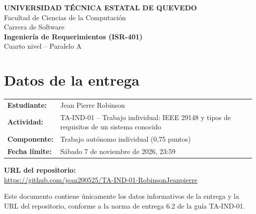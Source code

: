 \documentclass[12pt,a4paper]{article}
\begin{document}
\begin{center}
  {\large\bfseries UNIVERSIDAD TÉCNICA ESTATAL DE QUEVEDO}\\[4pt]
  Facultad de Ciencias de la Computación\\
  Carrera de Software\\[10pt]
  {\large\bfseries Ingeniería de Requerimientos (ISR-401)}\\[4pt]
  Cuarto nivel -- Paralelo A
\end{center}

\vspace{1.2cm}

\section*{Datos de la entrega}

\begin{tabular}{@{}p{4.5cm}p{10cm}@{}}
  \textbf{Estudiante:}      & Jean Pierre Robinson \\[6pt]
  \textbf{Actividad:}       & TA-IND-01 -- Trabajo individual: IEEE 29148 y
                              tipos de requisitos de un sistema conocido \\[6pt]
  \textbf{Componente:}      & Trabajo autónomo individual (0,75 puntos) \\[6pt]
  \textbf{Fecha límite:}    & Sábado 7 de noviembre de 2026, 23:59 \\
\end{tabular}

\vspace{0.8cm}

\noindent\textbf{URL del repositorio:}\\[4pt]
\noindent\url{https://github.com/jean200525/TA-IND-01-RobinsonJeanpierre}

\vspace{1.2cm}

\noindent\small
Este documento contiene únicamente los datos informativos de la entrega y la
URL del repositorio, conforme a la norma de entrega 6.2 de la guía TA-IND-01.
\end{document}
